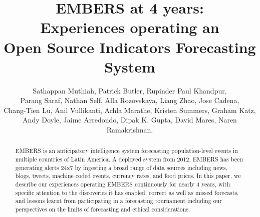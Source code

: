 \documentclass[11pt,a4paper,extrafontsizes,oneside]{article}
\begin{document}
\linespread{0.95}
\setlength{\parskip}{0pt}
\setlength{\parsep}{0pt}
\setlength{\topskip}{1pt}
\setlength{\topsep}{0pt}
\setlength{\partopsep}{0pt}





\makeatletter
\let\@copyrightspace\relax
\makeatother



\title{EMBERS at 4 years:\\
Experiences operating an \\
Open Source Indicators Forecasting System}

\author{
   Sathappan Muthiah\footnotemark[1],
  Patrick Butler\footnotemark[1],
  Rupinder Paul Khandpur\footnotemark[1],\\
  Parang Saraf\footnotemark[1],
  Nathan Self\footnotemark[1],
Alla Rozovskaya\footnotemark[1],
  Liang Zhao\footnotemark[1],
  Jose Cadena\footnotemark[2],\\
  Chang-Tien Lu\footnotemark[1],
  Anil Vullikanti\footnotemark[2],
  Achla Marathe\footnotemark[2],
  Kristen Summers\footnotemark[3],
  Graham Katz\footnotemark[4], \\
  Andy Doyle\footnotemark[4],
  Jaime Arredondo\footnotemark[5],
  Dipak K. Gupta\footnotemark[6],
  David Mares\footnotemark[5],
  Naren Ramakrishnan\footnotemark[1],
\\
}

\maketitle


\begin{abstract}
EMBERS is an anticipatory intelligence system forecasting population-level events in multiple
countries of Latin America. A deployed system from 2012, EMBERS has been generating alerts
24x7 by ingesting a broad range of data sources including news, blogs, tweets, machine coded events,
currency rates, and food prices.
In this paper, we describe our experiences operating EMBERS continuously for nearly 4 years,
with specific attention to the discoveries it has enabled, correct as well as missed
forecasts, and lessons learnt from participating in a forecasting tournament including
our perspectives on the limits of forecasting and ethical considerations.
\end{abstract}
\end{document}
